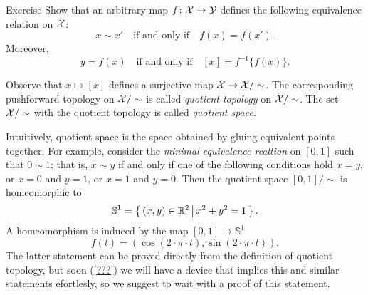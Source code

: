\begin{thm}{Exercise}
Show that an arbitrary map $f\colon\mathcal{X}\to \mathcal{Y}$ defines the following equivalence relation on $\mathcal{X}$:
\[x\sim x'\quad\text{if and only if}\quad f(x)=f(x').\]
Moreover,
\[y=f(x)\quad\text{if and only if}\quad [x]=f^{-1}\{f(x)\}.\]
\end{thm}

Observe that $x\mapsto [x]$ defines a surjective map $\mathcal{X}\to \mathcal{X}/\sim$.
The corresponding pushforward topology on $\mathcal{X}/\sim$ is called \emph{quotient topology} on $\mathcal{X}/\sim$.
The set $\mathcal{X}/\sim$ with the quotient topology is called \emph{quotient space}.

Intuitively, quotient space is the space obtained by gluing equivalent points together.
For example, consider the \emph{minimal equivalence realtion} on $[0,1]$ such that $0\sim 1$;
that is, $x\sim y$ if and only if one of the following conditions hold $x=y$, or $x=0$ and $y=1$, or $x=1$ and $y=0$.
Then the quotient space $[0,1]/\sim$ is homeomorphic to 
\[\mathbb{S}^1=\left\{\,{(x,y)\in\mathbb{R}^2}\,\middle|\,{x^2+y^2=1}\,\right\}.\]
A homeomorphism is induced by the map $[0,1]\to \mathbb{S}^1$
\[f(t)=\left(\cos(2\cdot\pi\cdot t),\sin(2\cdot\pi\cdot t)\right).\]
The latter statement can be proved directly from the definition of quotient topology, but soon (\ref{???}) we will have a device that implies this and similar statements efortlesly, so we suggest to wait with a proof of this statement.
